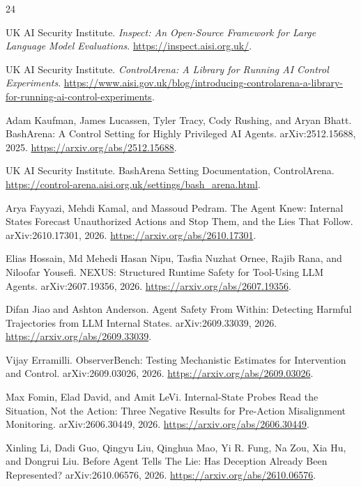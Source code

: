 \documentclass[11pt]{article}
\begin{document}
\begin{thebibliography}{24}

UK AI Security Institute.
\newblock \emph{Inspect: An Open-Source Framework for Large Language Model Evaluations}.
\newblock \url{https://inspect.aisi.org.uk/}.

UK AI Security Institute.
\newblock \emph{ControlArena: A Library for Running AI Control Experiments}.
\newblock \url{https://www.aisi.gov.uk/blog/introducing-controlarena-a-library-for-running-ai-control-experiments}.

Adam Kaufman, James Lucassen, Tyler Tracy, Cody Rushing, and Aryan Bhatt.
\newblock BashArena: A Control Setting for Highly Privileged AI Agents.
\newblock arXiv:2512.15688, 2025.
\newblock \url{https://arxiv.org/abs/2512.15688}.

UK AI Security Institute.
\newblock BashArena Setting Documentation, ControlArena.
\newblock \url{https://control-arena.aisi.org.uk/settings/bash_arena.html}.

Arya Fayyazi, Mehdi Kamal, and Massoud Pedram.
\newblock The Agent Knew: Internal States Forecast Unauthorized Actions and Stop Them, and the Lies That Follow.
\newblock arXiv:2610.17301, 2026.
\newblock \url{https://arxiv.org/abs/2610.17301}.

Elias Hossain, Md Mehedi Hasan Nipu, Tasfia Nuzhat Ornee, Rajib Rana, and Niloofar Yousefi.
\newblock NEXUS: Structured Runtime Safety for Tool-Using LLM Agents.
\newblock arXiv:2607.19356, 2026.
\newblock \url{https://arxiv.org/abs/2607.19356}.

Difan Jiao and Ashton Anderson.
\newblock Agent Safety From Within: Detecting Harmful Trajectories from LLM Internal States.
\newblock arXiv:2609.33039, 2026.
\newblock \url{https://arxiv.org/abs/2609.33039}.

Vijay Erramilli.
\newblock ObserverBench: Testing Mechanistic Estimates for Intervention and Control.
\newblock arXiv:2609.03026, 2026.
\newblock \url{https://arxiv.org/abs/2609.03026}.

Max Fomin, Elad David, and Amit LeVi.
\newblock Internal-State Probes Read the Situation, Not the Action: Three Negative Results for Pre-Action Misalignment Monitoring.
\newblock arXiv:2606.30449, 2026.
\newblock \url{https://arxiv.org/abs/2606.30449}.

Xinling Li, Dadi Guo, Qingyu Liu, Qinghua Mao, Yi R. Fung, Na Zou, Xia Hu, and Dongrui Liu.
\newblock Before Agent Tells The Lie: Has Deception Already Been Represented?
\newblock arXiv:2610.06576, 2026.
\newblock \url{https://arxiv.org/abs/2610.06576}.


\end{thebibliography}
\end{document}

